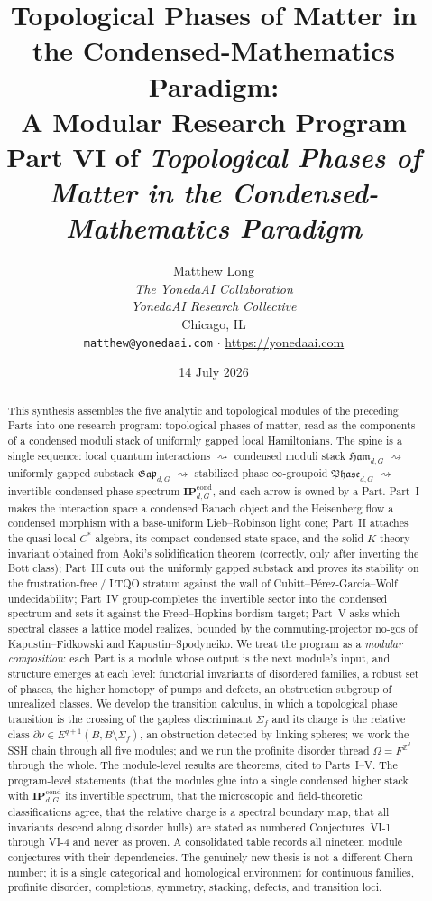 \documentclass[12pt]{article}
\title{\textbf{Topological Phases of Matter in the Condensed-Mathematics Paradigm:\\
A Modular Research Program}\\[0.4em]
\large Part VI of \emph{Topological Phases of Matter in the Condensed-Mathematics Paradigm}}
\author{Matthew Long \\
\textit{The YonedaAI Collaboration} \\
\textit{YonedaAI Research Collective} \\
Chicago, IL \\
\texttt{matthew@yonedaai.com} $\cdot$ \url{https://yonedaai.com}}
\date{14 July 2026}
\newcommand{\Ffun}{F}                          %
\newcommand{\Ham}{\mathfrak{Ham}}              %
\newcommand{\Gap}{\mathfrak{Gap}}              %
\newcommand{\Phase}{\mathfrak{Phase}}          %
\newcommand{\IPcond}{\mathbf{IP}^{\mathrm{cond}}}  %
\newcommand{\Sig}{\Sigma}                       %
\newcommand{\rc}{\partial\nu}                   %
\newcommand{\dis}{\Omega}                       %
\newcommand{\ZZ}{\mathbb{Z}}
\theoremstyle{plain}
\theoremstyle{definition}
\theoremstyle{remark}
\begin{document}
\maketitle

\begin{abstract}
This synthesis assembles the five analytic and topological modules of the preceding
Parts into one research program: topological phases of matter, read as the components
of a condensed moduli stack of uniformly gapped local Hamiltonians. The spine is a
single sequence:
local quantum interactions $\rightsquigarrow$ condensed moduli stack $\Ham_{d,G}$
$\rightsquigarrow$ uniformly gapped substack $\Gap_{d,G}$ $\rightsquigarrow$ stabilized
phase $\infty$-groupoid $\Phase_{d,G}$ $\rightsquigarrow$ invertible condensed phase
spectrum $\IPcond_{d,G}$, and each arrow is owned by a Part. Part~I makes the
interaction space a condensed Banach object and the Heisenberg flow a condensed
morphism with a base-uniform Lieb--Robinson light cone; Part~II attaches the
quasi-local $C^\ast$-algebra, its compact condensed state space, and the solid
$K$-theory invariant obtained from Aoki's solidification theorem (correctly, only
after inverting the Bott class); Part~III cuts out the uniformly gapped substack and
proves its stability on the frustration-free / LTQO stratum against the wall of
Cubitt--P\'erez-Garc\'ia--Wolf undecidability; Part~IV group-completes the invertible
sector into the condensed spectrum and sets it against the Freed--Hopkins bordism
target; Part~V asks which spectral classes a lattice model realizes, bounded by the
commuting-projector no-gos of Kapustin--Fidkowski and Kapustin--Spodyneiko. We treat the
program as a \emph{modular composition}: each
Part is a module whose output is the next module's input, and structure emerges at
each level: functorial invariants of disordered families, a robust set of phases, the
higher homotopy of pumps and defects, an obstruction subgroup of unrealized classes.
We develop the transition calculus, in which a topological phase transition is the
crossing of the gapless discriminant $\Sig_f$ and its charge is the relative class
$\rc\in E^{q+1}(B,B\setminus\Sig_f)$, an obstruction detected by linking spheres; we
work the SSH chain through all five modules; and we run the profinite disorder thread
$\dis=\Ffun^{\ZZ^d}$ through the whole. The module-level results are theorems, cited to
Parts~I--V\@. The program-level statements (that the modules glue into a single
condensed higher stack with $\IPcond_{d,G}$ its invertible spectrum, that the
microscopic and field-theoretic classifications agree, that the relative charge is a
spectral boundary map, that all invariants descend along disorder hulls) are stated as
numbered Conjectures~VI-1 through VI-4 and never as proven. A consolidated table
records all nineteen module conjectures with their dependencies. The genuinely new
thesis is not a different Chern number; it is a single categorical and homological
environment for continuous families, profinite disorder, completions, symmetry,
stacking, defects, and transition loci.
\end{abstract}
\end{document}
